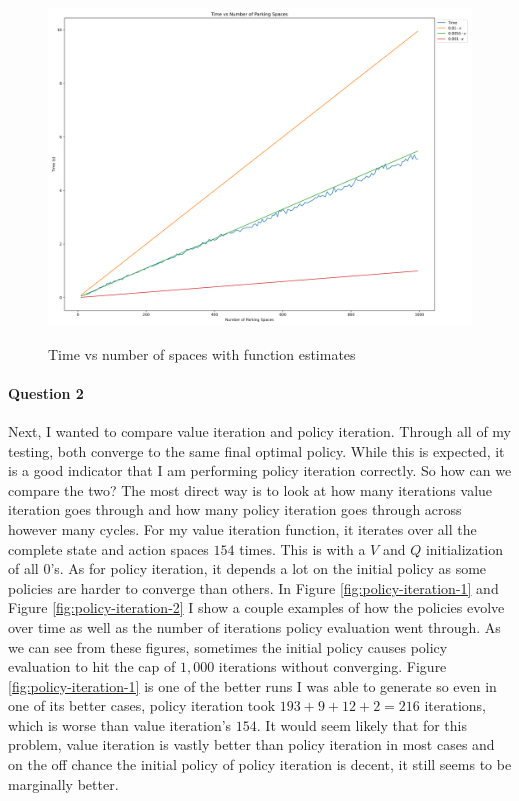 \documentclass[12pt]{article}
\begin{document}
\begin{figure}
  \includegraphics[width=0.95\linewidth]{Figures/time_vs_spaces_with_estimates.png}
  \centering
  \label{fig:time-vs-estimates}
  \caption{Time vs number of spaces with function estimates}
\end{figure}

\paragraph{Question 2} Next, I wanted to compare value iteration and policy iteration. Through all of my testing, both converge to the same final optimal policy. While this is expected, it is a good indicator that I am performing policy iteration correctly. So how can we compare the two? The most direct way is to look at how many iterations value iteration goes through and how many policy iteration goes through across however many cycles. For my value iteration function, it iterates over all the complete state and action spaces $154$ times. This is with a $V$ and $Q$ initialization of all 0's. As for policy iteration, it depends a lot on the initial policy as some policies are harder to converge than others. In Figure \ref{fig:policy-iteration-1} and Figure \ref{fig:policy-iteration-2} I show a couple examples of how the policies evolve over time as well as the number of iterations policy evaluation went through. As we can see from these figures, sometimes the initial policy causes policy evaluation to hit the cap of $1,000$ iterations without converging. Figure \ref{fig:policy-iteration-1} is one of the better runs I was able to generate so even in one of its better cases, policy iteration took $193 + 9 + 12 + 2 = 216$ iterations, which is worse than value iteration's $154$. It would seem likely that for this problem, value iteration is vastly better than policy iteration in most cases and on the off chance the initial policy of policy iteration is decent, it still seems to be marginally better.
\end{document}
